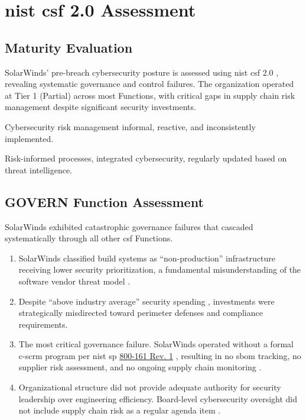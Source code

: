 \section{\gls{nist} \gls{csf} 2.0 Assessment}
\label{sec:nist_csf}

\subsection{Maturity Evaluation}
SolarWinds' pre-breach cybersecurity posture is assessed using \gls{nist} \gls{csf} 2.0 \cite{pascoe_nist_2024}, revealing systematic governance and control failures. The organization operated at Tier 1 (Partial) across most Functions, with critical gaps in supply chain risk management despite significant security investments.

 Cybersecurity risk management informal, reactive, and inconsistently implemented.

 Risk-informed processes, integrated cybersecurity, regularly updated based on threat intelligence.

\subsection{GOVERN Function Assessment}
SolarWinds exhibited catastrophic governance failures that cascaded systematically through all other \gls{csf} Functions.

\begin{enumerate}
    \item {} SolarWinds classified build systems as ``non-production'' infrastructure receiving lower security prioritization, a fundamental misunderstanding of the software vendor threat model \cite{boyens_cybersecurity_2022}.
    \item {} Despite ``above industry average'' security spending \cite{nagle_solarwinds_2023}, investments were strategically misdirected toward perimeter defenses and compliance requirements.
    \item {} The most critical governance failure. SolarWinds operated without a formal \gls{c-scrm} program per \gls{nist} \gls{sp} \href{https://csrc.nist.gov/pubs/sp/800/161/r1/upd1/final}{800-161 Rev. 1} \cite{boyens_cybersecurity_2022}, resulting in no \gls{sbom} tracking, no supplier risk assessment, and no ongoing supply chain monitoring \cite{boyens_cybersecurity_2022}.
    \item {} Organizational structure did not provide adequate authority for security leadership over engineering efficiency. Board-level cybersecurity oversight did not include supply chain risk as a regular agenda item \cite{nagle_solarwinds_2023}.
\end{enumerate}


